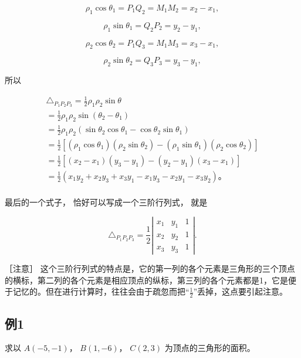 \[
\rho_{1} \cos \theta_{1} = P_{1} Q_{2} = M_{1} M_{2} = x_{2} - x_{1},
\]

\[
\rho_{1} \sin \theta_{1} = Q_{2} P_{2} = y_{2} - y_{1},
\]

\[
\rho_{2} \cos \theta_{2} = P_{1} Q_{3} = M_{1} M_{3} = x_{3} - x_{1},
\]

\[
\rho_{2} \sin \theta_{2} = Q_{3} P_{3} = y_{3} - y_{1},
\]

所以

\[
\begin{array}{l} \triangle_ {P_{1} P_{2} P_{3}} = \frac {1}{2} \rho_{1} \rho_{2} \sin \theta \\ = \frac {1}{2} \rho_{1} \rho_{2} \sin (\theta_{2} - \theta_{1}) \\ = \frac {1}{2} \rho_{1} \rho_{2} (\sin \theta_{2} \cos \theta_{1} - \cos \theta_{2} \sin \theta_{1}) \\ = \frac {1}{2} \left[ \left(\rho_{1} \cos \theta_{1}\right) \left(\rho_{2} \sin \theta_{2}\right) - \left(\rho_{1} \sin \theta_{1}\right) \left(\rho_{2} \cos \theta_{2}\right) \right] \\ = \frac {1}{2} \left[ \left(x_{2} - x_{1}\right) \left(y_{3} - y_{1}\right) - \left(y_{2} - y_{1}\right) \left(x_{3} - x_{1}\right) \right] \\ = \frac {1}{2} \left(x_{1} y_{2} + x_{2} y_{3} + x_{3} y_{1} - x_{1} y_{3} - x_{2} y_{1} - x_{3} y_{2}\right)\text{。} \\ \end{array}
\]

最后的一个式子， 恰好可以写成一个三阶行列式， 就是

\[
\triangle_ {P_{1} P_{2} P_{3}} = \frac {1}{2} \left| \begin{array}{lll} x_{1} & y_{1} & 1 \\ x_{2} & y_{2} & 1 \\ x_{3} & y_{3} & 1 \end{array} \right|.
\]

［注意］
这个三阶行列式的特点是，它的第一列的各个元素是三角形的三个顶点的横标，第二列的各个元素是相应顶点的纵标，第三列的各个元素都是1，它是便于记忆的。但在进行计算时，往往会由于疏忽而把``\(\frac{1}{2}\)''丢掉，这点要引起注意。

\subsection{例1}\label{ux4f8b1-6}

求以 \(A(-5, -1)\)， \(B(1, -6)\)， \(C(2, 3)\) 为顶点的三角形的面积。

